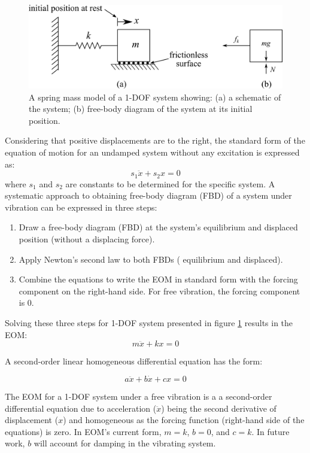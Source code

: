 \documentclass[12pt,letter]{article}
\begin{document}
		\begin{figure}[H]
			\centering
			\includegraphics[]{../figures/EOM_1-DOF-mass_horizontal.png}
			\caption{A spring mass model of a 1-DOF system showing: (a) a schematic of the system; (b)  free-body diagram of the system at its initial position.}
			\label{fig:EOM_1-DOF-mass_horizontal}
		\end{figure}			
		
		Considering that positive displacements are to the right, the standard form of the equation of motion for an undamped system without any excitation is expressed as:  
		\begin{equation}
			s_1 \ddot{x} + s_2 x = 0
		\end{equation}			
		where $s_1$ and $s_2$ are constants to be determined for the specific system. A systematic approach to obtaining free-body diagram (FBD) of a system under vibration can be expressed in three steps:
		\begin{enumerate}
			\item Draw a free-body diagram (FBD) at the system's equilibrium and displaced position (without a displacing force).
			\item Apply Newton's second law to both FBDs ( equilibrium and displaced).
			\item Combine the equations to write the EOM in standard form with the forcing component on the right-hand side. For free vibration, the forcing component is 0. 
		\end{enumerate}
			
		Solving these three steps for 1-DOF system presented in figure \ref{fig:EOM_1-DOF-mass_horizontal} results in the EOM:
		\begin{equation}
			m \ddot{x} + k x = 0
		\end{equation}

		\begin{review}
			A second-order linear homogeneous differential equation has the form:
			
			\begin{equation}
			 a \ddot{x} + b \dot{x} + cx = 0
			\end{equation}
		
			\noindent The EOM for a 1-DOF system under a free vibration is a a second-order differential equation due to acceleration ($\ddot{x}$) being the second derivative of displacement ($x$) and homogeneous as the forcing function (right-hand side of the equations) is zero. In EOM's current form, $m=k$, $b=0$,  and $c=k$. In future work, $b$ will account for damping in the vibrating system.     
		\end{review}
\end{document}
